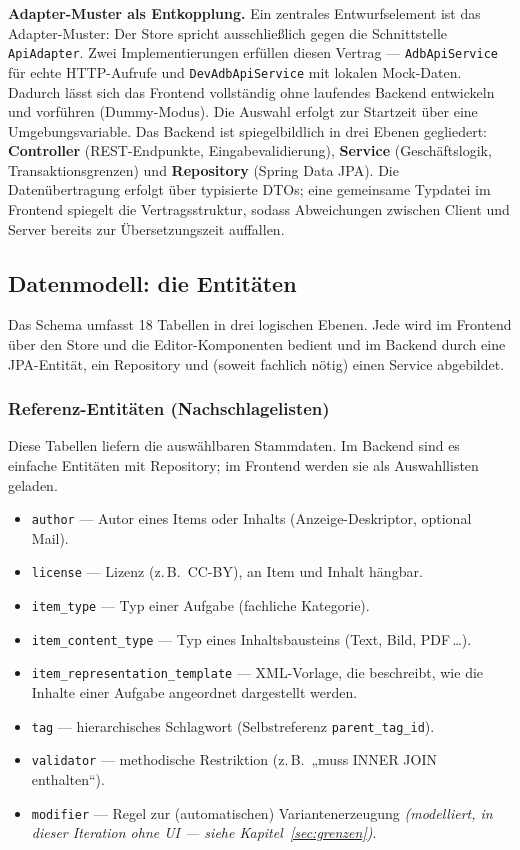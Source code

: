 \documentclass[11pt,a4paper]{article}
\begin{document}
\textbf{Adapter-Muster als Entkopplung.} Ein zentrales Entwurfselement ist das
Adapter-Muster: Der Store spricht ausschließlich gegen die Schnittstelle
\texttt{ApiAdapter}. Zwei Implementierungen erfüllen diesen Vertrag ---
\texttt{AdbApiService} für echte HTTP-Aufrufe und \texttt{DevAdbApiService} mit
lokalen Mock-Daten. Dadurch lässt sich das Frontend vollständig ohne laufendes
Backend entwickeln und vorführen (Dummy-Modus). Die Auswahl erfolgt zur Startzeit
über eine Umgebungsvariable. Das Backend ist spiegelbildlich in drei Ebenen
gegliedert: \textbf{Controller} (REST-Endpunkte, Eingabevalidierung),
\textbf{Service} (Geschäftslogik, Transaktionsgrenzen) und \textbf{Repository}
(Spring Data JPA). Die Datenübertragung erfolgt über typisierte DTOs; eine
gemeinsame Typdatei im Frontend spiegelt die Vertragsstruktur, sodass Abweichungen
zwischen Client und Server bereits zur Übersetzungszeit auffallen.

\subsection{Datenmodell: die Entitäten}
Das Schema umfasst 18 Tabellen in drei logischen Ebenen. Jede wird im Frontend
über den Store und die Editor-Komponenten bedient und im Backend durch eine
JPA-Entität, ein Repository und (soweit fachlich nötig) einen Service abgebildet.

\subsubsection{Referenz-Entitäten (Nachschlagelisten)}
Diese Tabellen liefern die auswählbaren Stammdaten. Im Backend sind es einfache
Entitäten mit Repository; im Frontend werden sie als Auswahllisten geladen.
\begin{itemize}
  \item \texttt{author} --- Autor eines Items oder Inhalts (Anzeige-Deskriptor,
  optional Mail).
  \item \texttt{license} --- Lizenz (z.\,B.\ CC-BY), an Item und Inhalt hängbar.
  \item \texttt{item\_type} --- Typ einer Aufgabe (fachliche Kategorie).
  \item \texttt{item\_content\_type} --- Typ eines Inhaltsbausteins (Text, Bild,
  PDF\,\ldots).
  \item \texttt{item\_representation\_template} --- XML-Vorlage, die beschreibt,
  wie die Inhalte einer Aufgabe angeordnet dargestellt werden.
  \item \texttt{tag} --- hierarchisches Schlagwort (Selbstreferenz
  \texttt{parent\_tag\_id}).
  \item \texttt{validator} --- methodische Restriktion (z.\,B.\ „muss INNER JOIN
  enthalten``).
  \item \texttt{modifier} --- Regel zur (automatischen) Variantenerzeugung
  \emph{(modelliert, in dieser Iteration ohne UI --- siehe
  Kapitel~\ref{sec:grenzen})}.
\end{itemize}
\end{document}
